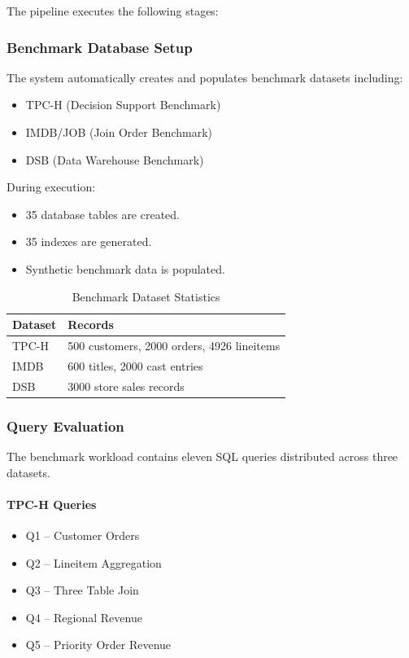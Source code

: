 \documentclass[12pt,a4paper]{article}
\begin{document}
The pipeline executes the following stages:

\subsubsection{Benchmark Database Setup}

The system automatically creates and populates benchmark datasets including:

\begin{itemize}
    \item TPC-H (Decision Support Benchmark)
    \item IMDB/JOB (Join Order Benchmark)
    \item DSB (Data Warehouse Benchmark)
\end{itemize}

During execution:

\begin{itemize}
    \item 35 database tables are created.
    \item 35 indexes are generated.
    \item Synthetic benchmark data is populated.
\end{itemize}

\begin{table}[h]
\centering
\caption{Benchmark Dataset Statistics}
\begin{tabular}{|l|l|}
\hline
Dataset & Records \\ \hline
TPC-H & 500 customers, 2000 orders, 4926 lineitems \\ \hline
IMDB & 600 titles, 2000 cast entries \\ \hline
DSB & 3000 store sales records \\ \hline
\end{tabular}
\end{table}

\subsubsection{Query Evaluation}

The benchmark workload contains eleven SQL queries distributed across three datasets.

\paragraph{TPC-H Queries}
\begin{itemize}
    \item Q1 -- Customer Orders
    \item Q2 -- Lineitem Aggregation
    \item Q3 -- Three Table Join
    \item Q4 -- Regional Revenue
    \item Q5 -- Priority Order Revenue
\end{itemize}
\end{document}
